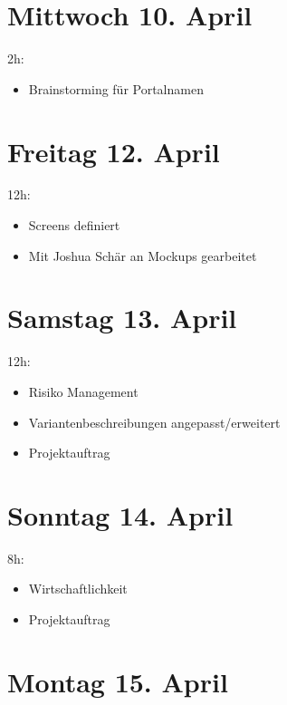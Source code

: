 \section{Mittwoch 10. April}\label{mittwoch-10.april}

2h:

\begin{itemize}
  \tightlist
  \item
        Brainstorming für Portalnamen
\end{itemize}

\section{Freitag 12. April}\label{freitag-12.april}

12h:

\begin{itemize}
  \tightlist
  \item
        Screens definiert
  \item
        Mit Joshua Schär an Mockups gearbeitet
\end{itemize}

\section{Samstag 13. April}\label{samstag-13.april}

12h:

\begin{itemize}
  \tightlist
  \item
        Risiko Management
  \item
        Variantenbeschreibungen angepasst/erweitert
  \item
        Projektauftrag
\end{itemize}

\section{Sonntag 14. April}\label{sonntag-14.april}

8h:

\begin{itemize}
  \tightlist
  \item
        Wirtschaftlichkeit
  \item
        Projektauftrag
\end{itemize}

\section{Montag 15. April}\label{montag-15.april}

